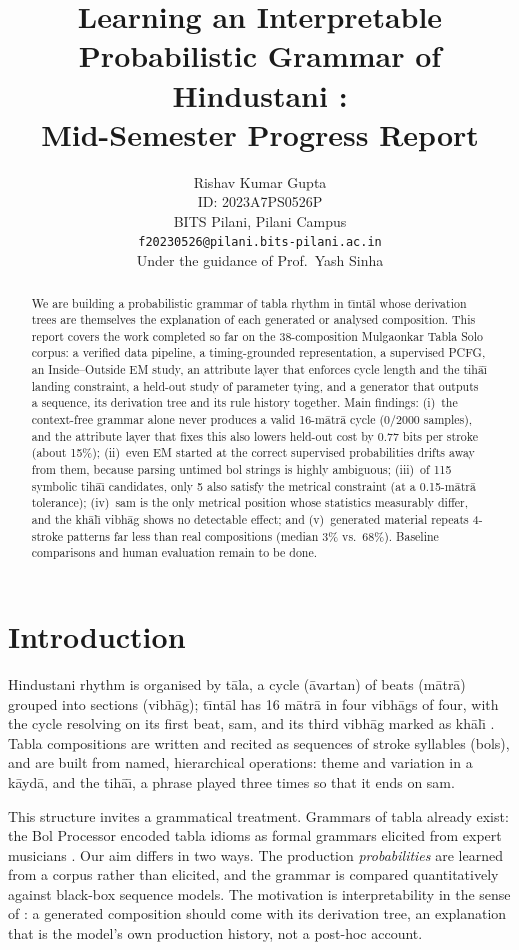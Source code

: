 \documentclass[11pt]{article}
\title{Learning an Interpretable Probabilistic Grammar of Hindustani \Tala:\\ Mid-Semester Progress Report}
\author{Rishav Kumar Gupta \\
  ID: 2023A7PS0526P \\
  BITS Pilani, Pilani Campus \\
  \texttt{f20230526@pilani.bits-pilani.ac.in} \\
  Under the guidance of Prof.\ Yash Sinha}
\newcommand{\matra}{m\=atr\=a}
\newcommand{\tala}{t\=ala}
\newcommand{\avartan}{\=avartan}
\newcommand{\vibhag}{vibh\=ag}
\newcommand{\khali}{kh\=al\={\i}}
\newcommand{\tihai}{tih\=a\={\i}}
\newcommand{\kayda}{k\=ayd\=a}
\begin{document}
\maketitle

\begin{abstract}
We are building a probabilistic grammar of tabla rhythm in t\={\i}nt\=al whose
derivation trees are themselves the explanation of each generated or analysed
composition. This report covers the work completed so far on the 38-composition
Mulgaonkar Tabla Solo corpus: a verified data pipeline, a timing-grounded
representation, a supervised PCFG, an Inside--Outside EM study, an attribute
layer that enforces cycle length and the \tihai{} landing constraint, a
held-out study of parameter tying, and a generator that outputs a sequence,
its derivation tree and its rule history together. Main findings: (i)~the
context-free grammar alone never produces a valid 16-\matra{} cycle (0/2000
samples), and the attribute layer that fixes this also lowers held-out cost by
0.77 bits per stroke (about 15\%); (ii)~even EM started at the correct
supervised probabilities drifts away from them, because parsing untimed bol
strings is highly ambiguous; (iii)~of 115 symbolic \tihai{} candidates, only
5 also satisfy the metrical constraint (at a 0.15-\matra{} tolerance); (iv)~sam is the only metrical position
whose statistics measurably differ, and the \khali{} \vibhag{} shows no
detectable effect; and (v)~generated material repeats 4-stroke patterns far
less than real compositions (median 3\% vs.\ 68\%). Baseline comparisons and
human evaluation remain to be done.
\end{abstract}

\section{Introduction}

Hindustani rhythm is organised by \tala{}, a cycle (\avartan{}) of beats
(\matra{}) grouped into sections (\vibhag{}); t\={\i}nt\=al has 16 \matra{} in four
\vibhag{}s of four, with the cycle resolving on its first beat, sam, and its
third \vibhag{} marked as \khali{} \citep{clayton2000time}. Tabla
compositions are written and recited as sequences of stroke syllables (bols),
and are built from named, hierarchical operations: theme and variation in a
\kayda{}, and the \tihai{}, a phrase played three times so that it ends on
sam.

This structure invites a grammatical treatment. Grammars of tabla already
exist: the Bol Processor encoded tabla idioms as formal grammars elicited from
expert musicians \citep{kippen1989identification,kippen1992modelling}. Our aim
differs in two ways. The production \emph{probabilities} are learned from a
corpus rather than elicited, and the grammar is compared quantitatively
against black-box sequence models. The motivation is interpretability in the
sense of \citet{rudin2019stop}: a generated composition should come with its
derivation tree, an explanation that is the model's own production history,
not a post-hoc account.
\end{document}
